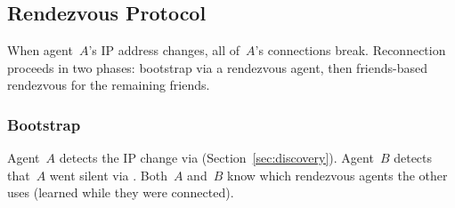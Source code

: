 \subsection{Rendezvous Protocol}
\label{sec:rv-protocol}
When agent~$A$'s IP address changes, all of~$A$'s connections break.  Reconnection proceeds in two phases: bootstrap via a rendezvous agent, then friends-based rendezvous for the remaining friends.

\subsubsection{Bootstrap}
\label{sec:bootstrap}

Agent~$A$ detects the IP change via  (Section~\ref{sec:discovery}).  Agent~$B$ detects that~$A$ went silent via .  Both~$A$ and~$B$ know which rendezvous agents the other uses (learned while they were connected).


